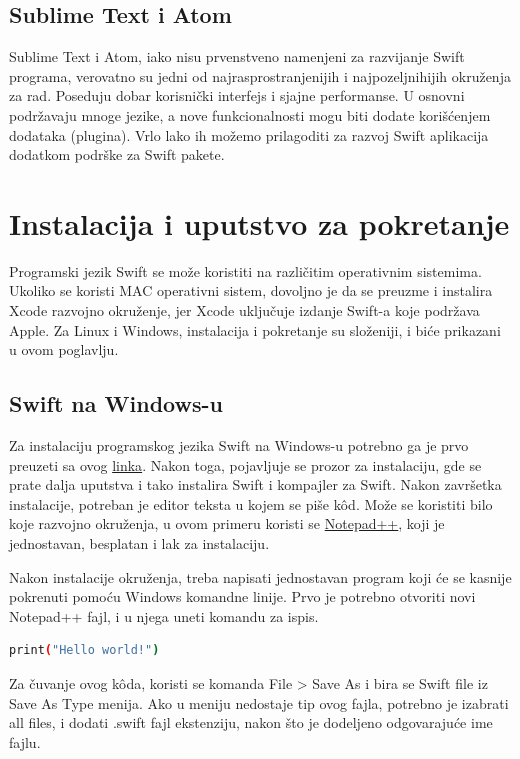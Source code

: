 \documentclass[a4paper]{article}
\begin{document}
\subsection{Sublime Text i Atom}
\label{subsec:podnaslovAtom}
Sublime Text i Atom, iako nisu prvenstveno namenjeni za razvijanje Swift programa, verovatno su jedni od najrasprostranjenijih i najpozeljnihijih okruženja za rad. Poseduju dobar korisnički interfejs i sjajne performanse. U osnovni podržavaju mnoge jezike, a nove funkcionalnosti mogu biti dodate korišćenjem dodataka (plugina). Vrlo lako ih možemo prilagoditi za razvoj Swift aplikacija dodatkom podrške za Swift pakete.

\section{Instalacija i uputstvo za pokretanje}	
\label{sec:sestiDeo}
Programski jezik Swift se može koristiti na različitim operativnim sistemima. Ukoliko se koristi MAC operativni sistem, dovoljno je da se preuzme i instalira Xcode razvojno okruženje, jer Xcode uključuje izdanje Swift-a koje podržava Apple. Za Linux i Windows, instalacija i pokretanje su složeniji, i biće prikazani u ovom poglavlju.

\subsection{Swift na Windows-u}
\label{subsec:podnaslovWindows}
Za instalaciju programskog jezika Swift na Windows-u potrebno ga je prvo preuzeti sa ovog \href{https://swiftforwindows.github.io}{linka}. Nakon toga, pojavljuje se prozor za instalaciju, gde se prate dalja uputstva i tako instalira Swift i kompajler za Swift. Nakon završetka instalacije, potreban je editor teksta u kojem se piše k\^{o}d. Može se koristiti bilo koje razvojno okruženja, u ovom primeru koristi se \href{https://notepad-plus-plus.org/download/v7.6.4.html}{Notepad++}, koji je jednostavan, besplatan i lak za instalaciju.

Nakon instalacije okruženja, treba napisati jednostavan program koji će se kasnije pokrenuti pomoću Windows komandne linije. Prvo je potrebno otvoriti novi Notepad++ fajl, i u njega uneti komandu za ispis.

\begin{lstlisting}[language=bash, caption={Primer komande}]
print("Hello world!")
\end{lstlisting}

Za čuvanje ovog k\^{o}da, koristi se komanda File > Save As i bira se Swift file iz Save As Type menija. Ako u meniju nedostaje tip ovog fajla, potrebno je izabrati all files, i dodati .swift fajl ekstenziju, nakon što je dodeljeno odgovarajuće ime fajlu.
\end{document}
